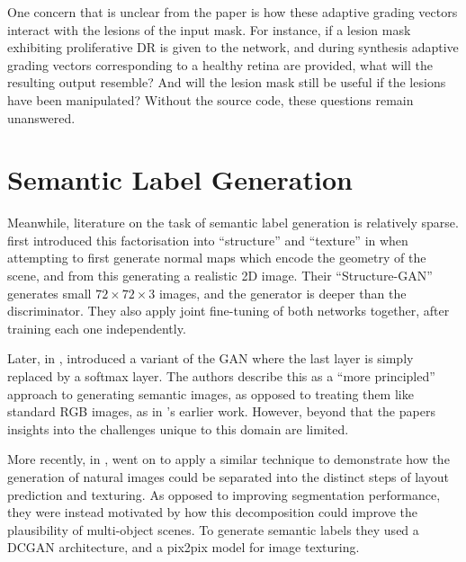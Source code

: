 One concern that is unclear from the paper is how these adaptive grading vectors interact with the lesions of the input mask.
For instance, if a lesion mask exhibiting proliferative DR is given to the network, and during synthesis adaptive grading vectors corresponding to a healthy retina are provided, what will the resulting output resemble? 
And will the lesion mask still be useful if the lesions have been manipulated?
Without the source code, these questions remain unanswered.

\section{Semantic Label Generation}

Meanwhile, literature on the task of semantic label generation is relatively sparse.
\citeauthor{wang2016} \cite{wang2016} first introduced this factorisation into ``structure'' and ``texture'' in \citeyear{wang2016} when attempting to first generate normal maps which encode the geometry of the scene, and from this generating a realistic 2D image.
Their ``Structure-GAN'' generates small $72\times72\times3$ images, and the generator is deeper than the discriminator.
They also apply joint fine-tuning of both networks together, after training each one independently.

Later, in \citeyear{ghelfi2019}, \citeauthor{ghelfi2019} \cite{ghelfi2019} introduced a variant of the GAN where the last layer is simply replaced by a softmax layer.
The authors describe this as a ``more principled'' approach to generating semantic images, as opposed to treating them like standard RGB images, as in \citeauthor{wang2016}'s earlier work.
However, beyond that the papers insights into the challenges unique to this domain are limited.

More recently, in \citeyear{volokitin2020}, \citeauthor{volokitin2020} \cite{volokitin2020} went on to apply a similar technique to demonstrate how the generation of natural images could be separated into the distinct steps of layout prediction and texturing.
As opposed to improving segmentation performance, they were instead motivated by how this decomposition could improve the plausibility of multi-object scenes.
To generate semantic labels they used a DCGAN architecture, and a pix2pix model for image texturing.

